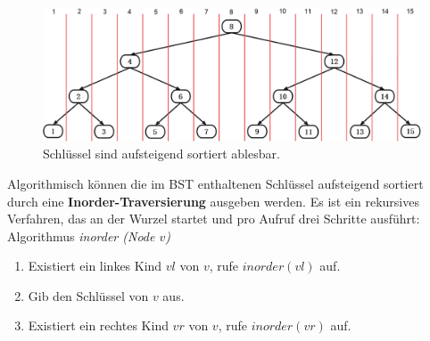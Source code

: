 \documentclass[a4paper,12pt]{article}
\begin{document}
\begin{figure}[H]
	\centering
	\includegraphics[width= 1\textwidth]{"Medien/Einleitung/linksRechts"}
	\caption{Schlüssel sind aufsteigend sortiert ablesbar. }
	\label{fig:linksRechts}
\end{figure}
\noindent Algorithmisch können die im BST enthaltenen Schlüssel aufsteigend sortiert durch eine \textbf{Inorder-Traversierung} ausgeben werden. Es ist ein rekursives Verfahren, das an der Wurzel startet und pro Aufruf drei Schritte ausführt:\\

Algorithmus \textit{inorder (Node $v$)}
\begin{enumerate}
	\item Existiert ein linkes Kind $\mathit{vl}$ von $v$, rufe $\mathit{inorder(vl)}$ auf. 
	\item Gib den Schlüssel von $v$ aus. 
	\item Existiert ein rechtes Kind $\mathit{vr}$ von $v$, rufe $\mathit{inorder(vr)}$ auf. 
\end{enumerate}
\end{document}
